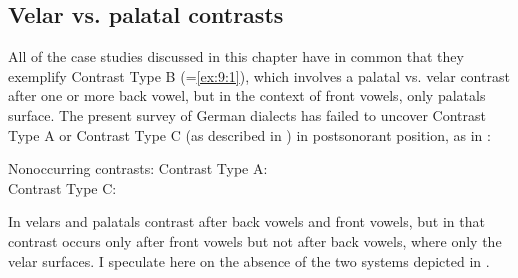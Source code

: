 \subsection{Velar vs. palatal contrasts}\label{sec:9.4.1}

All of the case studies discussed in this chapter have in common that they exemplify Contrast Type B (=\ref{ex:9:1}), which involves a palatal vs. velar contrast after one or more back vowel, but in the context of front vowels, only palatals surface. The present survey of German dialects has failed to uncover Contrast Type A or Contrast Type C (as described in ) in postsonorant position, as in :

\ea \label{ex:9:41}  Nonoccurring contrasts:
\ea Contrast Type A:\label{ex:9:41a}\smallskip\\

\ex Contrast Type C:\label{ex:9:41b}\smallskip\\
  \z
\z 

In  velars and palatals contrast after back vowels and front vowels, but in  that contrast occurs only after front vowels but not after back vowels, where only the velar surfaces. I speculate here on the absence of the two systems depicted in .


